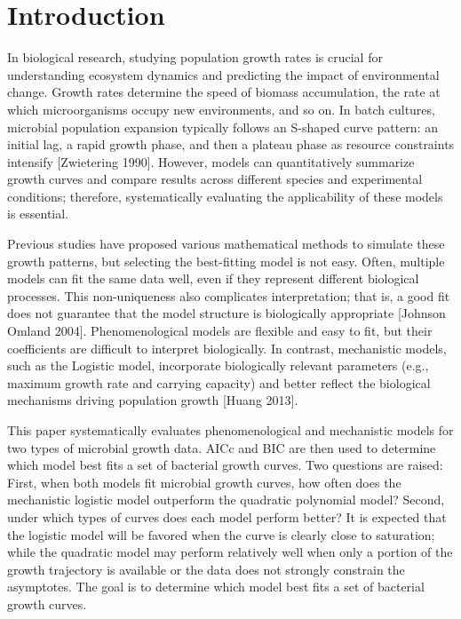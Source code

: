 \documentclass{article}
\begin{document}
\section{Introduction}
In biological research, studying population growth rates is crucial for understanding ecosystem dynamics and predicting the impact of environmental change. Growth rates determine the speed of biomass accumulation, the rate at which microorganisms occupy new environments, and so on. In batch cultures, microbial population expansion typically follows an S-shaped curve pattern: an initial lag, a rapid growth phase, and then a plateau phase as resource constraints intensify [Zwietering 1990]. However, models can quantitatively summarize growth curves and compare results across different species and experimental conditions; therefore, systematically evaluating the applicability of these models is essential.

Previous studies have proposed various mathematical methods to simulate these growth patterns, but selecting the best-fitting model is not easy. Often, multiple models can fit the same data well, even if they represent different biological processes. This non-uniqueness also complicates interpretation; that is, a good fit does not guarantee that the model structure is biologically appropriate [Johnson Omland 2004]. Phenomenological models are flexible and easy to fit, but their coefficients are difficult to interpret biologically. In contrast, mechanistic models, such as the Logistic model, incorporate biologically relevant parameters (e.g., maximum growth rate and carrying capacity) and better reflect the biological mechanisms driving population growth [Huang 2013].

This paper systematically evaluates phenomenological and mechanistic models for two types of microbial growth data. AICc and BIC are then used to determine which model best fits a set of bacterial growth curves. Two questions are raised: First, when both models fit microbial growth curves, how often does the mechanistic logistic model outperform the quadratic polynomial model? Second, under which types of curves does each model perform better? It is expected that the logistic model will be favored when the curve is clearly close to saturation; while the quadratic model may perform relatively well when only a portion of the growth trajectory is available or the data does not strongly constrain the asymptotes. The goal is to determine which model best fits a set of bacterial growth curves.
\end{document}
